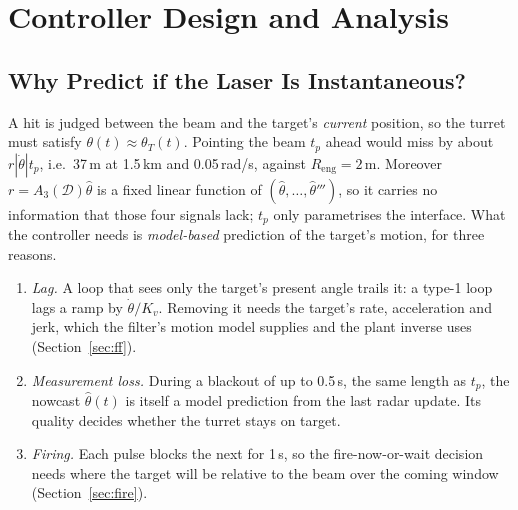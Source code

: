 \documentclass[conference]{IEEEtran}
\newcommand{\D}{\mathcal{D}}
\newcommand{\Reng}{R_{\mathrm{eng}}}
\begin{document}
\section{Controller Design and Analysis}

\subsection{Why Predict if the Laser Is Instantaneous?}
A hit is judged between the beam and the target's \emph{current} position, so the turret must satisfy $\theta(t)\approx\theta_T(t)$. Pointing the beam $t_p$ ahead would miss by about $r|\dot\theta|t_p$, i.e.\ 37\,m at 1.5\,km and 0.05\,rad/s, against $\Reng=2$\,m. Moreover $r=A_3(\D)\hat\theta$ is a fixed linear function of $(\hat\theta,\dots,\hat\theta''')$, so it carries no information that those four signals lack; $t_p$ only parametrises the interface. What the controller needs is \emph{model-based} prediction of the target's motion, for three reasons.
\begin{enumerate}
\item \emph{Lag.} A loop that sees only the target's present angle trails it: a type-1 loop lags a ramp by $\dot\theta/K_v$. Removing it needs the target's rate, acceleration and jerk, which the filter's motion model supplies and the plant inverse uses (Section~\ref{sec:ff}).
\item \emph{Measurement loss.} During a blackout of up to 0.5\,s, the same length as $t_p$, the nowcast $\hat\theta(t)$ is itself a model prediction from the last radar update. Its quality decides whether the turret stays on target.
\item \emph{Firing.} Each pulse blocks the next for 1\,s, so the fire-now-or-wait decision needs where the target will be relative to the beam over the coming window (Section~\ref{sec:fire}).
\end{enumerate}
\end{document}
